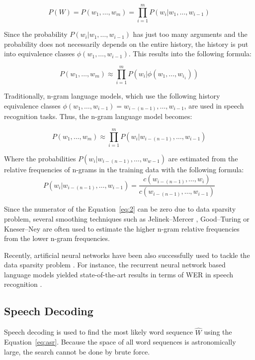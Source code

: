 \begin{equation}
  P(W) = P(w_1,\dots,w_m) = \prod\limits_{i=1}^{m} P(w_i|w_1,\dots,w_{i-1})
\end{equation}

Since the probability $P(w_i|w_1,\dots,w_{i-1})$ has just too many arguments
  and the probability does not necessarily depends on the entire history,
  the history is put into equivalence classes $\phi(w_1,\dots,w_{i-1})$.
This results into the following formula:

\begin{equation}
  P(w_1,\dots,w_m) \approx \prod\limits_{i=1}^{m} P(w_i|\phi(w_1,\dots,w_{i_1}))
\end{equation}

Traditionally, n-gram language models,
  which use the following history equivalence classes $\phi(w_1,\dots,w_{i-1}) = w_{i-(n-1)},\dots,w_{i-1}$,
  are used in speech recognition tasks.
Thus, the n-gram language model becomes:

\begin{equation}
  P(w_1,\dots,w_m) \approx \prod\limits_{i=1}^{m} P(w_i|w_{i-(n-1)},\dots,w_{i-1})
\end{equation}

Where the probabilities $P(w_i|w_{i-(n-1)},\dots,w_{w-1})$ are estimated from the relative frequencies of n-grams in the training data with the following formula:
\begin{equation}
  \label{eq:2}
  P(w_i|w_{i-(n-1)},\dots,w_{i-1}) = \frac{c(w_{i-(n-1)},\dots,w_i)}{c(w_{i-(n-1)},\dots,w_{i-1})}
\end{equation}


Since the numerator of the Equation~\ref{eq:2} can be zero due to data sparsity problem,
  several smoothing techniques such as
  Jelinek--Mercer \cite{jelinek1980interpolated},
  Good--Turing \cite{gale1995good}
  or Kneser--Ney \cite{kneser1995improved} are often used to estimate the higher n-gram relative frequencies from the lower n-gram frequencies.

Recently, artificial neural networks have been also successfully used to tackle the data sparsity problem \cite{bengio2003neural}.
For instance, the recurrent neural network based language models yielded state-of-the-art results in terms of WER in speech recognition \cite{mikolov2010recurrent}.


\subsection{Speech Decoding}
Speech decoding is used to find the most likely word sequence $\widehat{W}$ using the Equation~\ref{eq:asr}.
Because the space of all word sequences is astronomically large, the search cannot be done by brute force.

